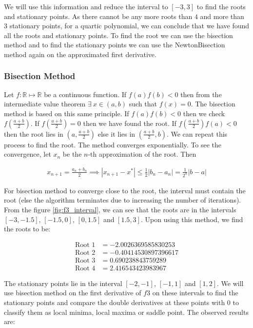 \documentclass{article}
\begin{document}
We will use this information and reduce the interval to $[-3, 3]$ to find the roots and stationary points. As there cannot be any more roots than $4$ and more than $3$ stationary points, for a quartic polynomial, we can conclude that we have found all the roots and stationary points. To find the root we can use the bisection method and to find the stationary points we can use the NewtonBisection method again on the approximated first derivative.

\subsubsection*{Bisection Method}

Let $f: \mathbb{R} \mapsto \mathbb{R}$ be a continuous function. If $f(a)f(b) < 0$ then from the intermediate value theorem $\exists\ x \in (a, b)$ such that $f(x) = 0$. The bisection method is based on this same principle. If $f(a) f(b) < 0$ then we check $f\left(\frac{a + b}{2}\right)$. If $f\left(\frac{a + b}{2}\right) = 0$ then we have found the root. If $f\left(\frac{a + b}{2}\right) f(a) < 0$ then the root lies in $(a, \frac{a + b}{2})$ else it lies in $(\frac{a + b}{2}, b)$. We can repeat this process to find the root. The method converges exponentially. To see the convergence, let $x_n$ be the $n$-th approximation of the root. Then

\begin{align*}
    x_{n + 1} = \frac{a_n + b_n}{2} \implies |x_{n + 1} - x^*| \leq \frac{1}{2}|b_n - a_n| = \frac{1}{2^n}|b - a|
\end{align*}

For bisection method to converge close to the root, the interval must contain the root (else the algorithm terminates due to increasing the number of iterations). From the figure \ref{fig:f3_interval}, we can see that the roots are in the intervals $[-3, -1.5]$, $[-1.5, 0]$, $[0, 1.5]$ and $[1.5, 3]$. Upon using this method, we find the roots to be:

\begin{align*}
    \text{Root 1} &= -2.0026369585830253 \\
    \text{Root 2} &= -0.40414530897396617 \\
    \text{Root 3} &= 0.690238843759289 \\
    \text{Root 4} &= 2.416543423983967
\end{align*}

The stationary points lie in the interval $[-2, -1]$, $[-1, 1]$ and $[1, 2]$. We will use bisection method on the first derivative of $f3$ on these intervals to find the stationary points and compare the double derivatives at these points with $0$ to classify them as local minima, local maxima or saddle point. The observed results are:
\end{document}
